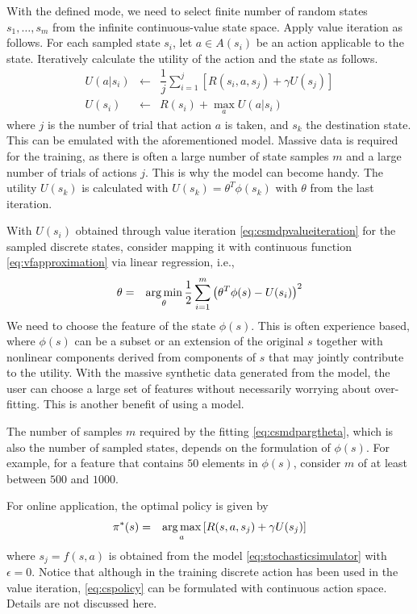 With the defined mode, we need to select finite number of random states $s_1,\ldots,s_m$ from the infinite continuous-value state space. Apply value iteration as follows. For each sampled state $s_i$, let $a\in A(s_i)$ be an action applicable to the state. Iteratively calculate the utility of the action and the state as follows.
\begin{eqnarray}
	U(a|s_i) &\leftarrow& \dfrac{1}{j}\sum_{i=1}^{j} \left[R(s_i, a, s_j) + \gamma U(s_j)\right] \label{eq:csmdpvalueiterationaction} \\
	U(s_i) &\leftarrow& R(s_i) + \max_{a} U(a|s_i) \label{eq:csmdpvalueiteration}
\end{eqnarray}
where $j$ is the number of trial that action $a$ is taken, and $s_k$ the destination state. This can be emulated with the aforementioned model. Massive data is required for the training, as there is often a large number of state samples $m$ and a large number of trials of actions $j$. This is why the model can become handy. The utility $U(s_k)$ is calculated with $U(s_k) = \theta^T\phi(s_k)$ with $\theta$ from the last iteration.

With $U(s_i)$ obtained through value iteration \eqref{eq:csmdpvalueiteration} for the sampled discrete states, consider mapping it with continuous function \eqref{eq:vfapproximation} via linear regression, i.e.,
\begin{eqnarray}
	\theta &=& \operatorname*{arg\,min}_{\theta} \dfrac{1}{2} \sum_{i=1}^{m} \left(\theta^T\phi(s) - U(s_i)\right)^2 \label{eq:csmdpargtheta}
\end{eqnarray}
We need to choose the feature of the state $\phi(s)$. This is often experience based, where $\phi(s)$ can be a subset or an extension of the original $s$ together with nonlinear components derived from components of $s$ that may jointly contribute to the utility. With the massive synthetic data generated from the model, the user can choose a large set of features without necessarily worrying about over-fitting. This is another benefit of using a model.

The number of samples $m$ required by the fitting \eqref{eq:csmdpargtheta}, which is also the number of sampled states, depends on the formulation of $\phi(s)$. For example, for a feature that contains $50$ elements in $\phi(s)$, consider $m$ of at least between $500$ and $1000$.

For online application, the optimal policy is given by
\begin{eqnarray}
	\pi^*(s) &=& \operatorname*{arg\,max}_{a} \left[R(s, a, s_j) + \gamma U(s_j)\right] \label{eq:cspolicy}
\end{eqnarray}
where $s_j = f(s,a)$ is obtained from the model \eqref{eq:stochasticsimulator} with $\epsilon=0$. Notice that although in the training discrete action has been used in the value iteration, \eqref{eq:cspolicy} can be formulated with continuous action space. Details are not discussed here. 

